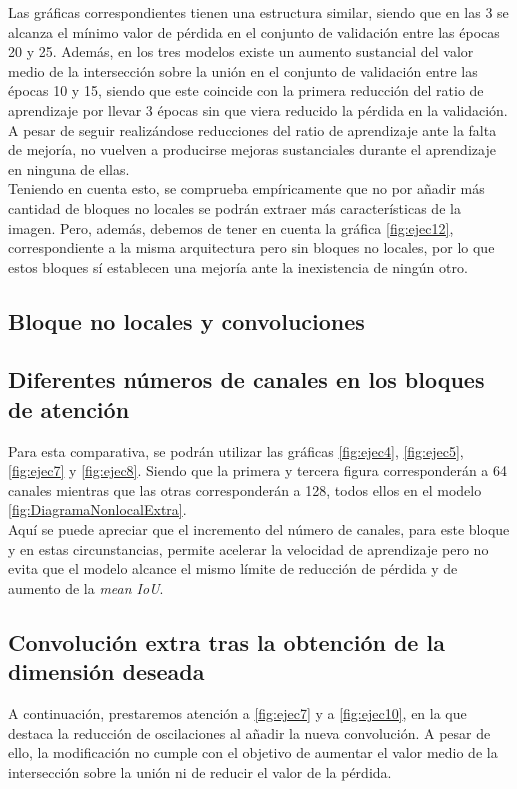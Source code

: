 Las gráficas correspondientes tienen una estructura similar, siendo que en las 3 se alcanza el mínimo valor de pérdida en el conjunto de validación entre las épocas 20 y 25. Además, en los tres modelos existe un aumento  sustancial del valor medio de la intersección sobre la unión en el conjunto de validación entre las épocas 10 y 15, siendo que este coincide con la primera reducción del ratio de aprendizaje por llevar 3 épocas sin que viera reducido la pérdida en la validación.\\

A pesar de seguir realizándose reducciones del ratio de aprendizaje ante la falta de mejoría, no vuelven a producirse mejoras sustanciales durante el aprendizaje en ninguna de ellas.\\

Teniendo en cuenta esto, se comprueba empíricamente que no por añadir más cantidad de bloques no locales se podrán extraer más características de la imagen. Pero, además, debemos de tener en cuenta la gráfica \autoref{fig:ejec12}, correspondiente a la misma arquitectura pero sin bloques no locales, por lo que estos bloques sí establecen una mejoría ante la inexistencia de ningún otro.

\subsection{Bloque no locales y convoluciones}

\subsection{Diferentes números de canales en los bloques de atención}
Para esta comparativa, se podrán utilizar las gráficas \autoref{fig:ejec4}, \autoref{fig:ejec5}, \autoref{fig:ejec7} y \autoref{fig:ejec8}. Siendo que la primera y tercera figura corresponderán a 64 canales mientras que las otras corresponderán a 128, todos ellos en el modelo \autoref{fig:DiagramaNonlocalExtra}.\\

Aquí se puede apreciar que el incremento del número de canales, para este bloque y en estas circunstancias, permite acelerar la velocidad de aprendizaje pero no evita que el modelo alcance el mismo límite de reducción de pérdida y de aumento de la \emph{mean IoU}.

\subsection{Convolución extra tras la obtención de la dimensión deseada}
A continuación, prestaremos atención a \autoref{fig:ejec7} y a \autoref{fig:ejec10}, en la que destaca la reducción de oscilaciones al añadir la nueva convolución. A pesar de ello, la modificación no cumple con el objetivo de aumentar el valor medio de la intersección sobre la unión ni de reducir el valor de la pérdida.\\

